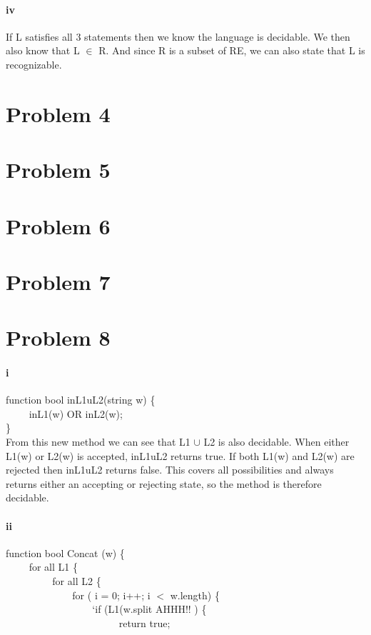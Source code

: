 \documentclass[10pt,letter]{article}
\begin{document}
\paragraph{iv}
If L satisfies all 3 statements then we know the language is decidable. We then also know that L $\in$ R. And since R is a subset of RE, we can also state that L is recognizable. 
\section*{Problem 4}
\section*{Problem 5}
\section*{Problem 6}
\section*{Problem 7}
\section*{Problem 8}
\paragraph{i}
 function bool inL1uL2(string w) \{ \\
$\qquad$  inL1(w) OR inL2(w); \\
\} \\
From this new method we can see that L1 $\cup$ L2 is also decidable. When either L1(w) or L2(w) is accepted, inL1uL2 returns true. If both L1(w) and L2(w) are rejected then inL1uL2 returns false. This covers all possibilities and always returns either an accepting or rejecting state, so the method is therefore decidable. 

\paragraph{ii}
function bool Concat (w)  \{  \\
$\qquad$	for all L1 \{ \\
$\qquad$ $\qquad$ for all L2 \{ \\
$\qquad$$\qquad$ $\qquad$ for ( i = 0; i++; i $<$ w.length) \{ \\	
$\qquad$$\qquad$ $\qquad$ $\qquad$`if (L1(w.split AHHH!! ) \{ \\
$\qquad$$\qquad$ $\qquad$ $\qquad$ $\qquad$ return true;
\end{document}
